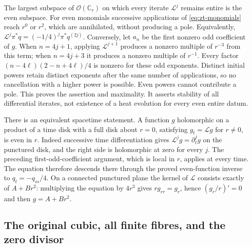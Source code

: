 The largest subspace of $\mathcal O(\mathbb C_r)$ on which every
iterate $\mathcal L^j$ remains entire is the even subspace.  For even
monomials successive applications of \eqref{eq:zt-monomials} reach
$r^0$ or $r^2$, which are annihilated, without producing a pole.
Equivalently, $\mathcal L^j\pi^*q=(-1/4)^j\pi^*q^{(2j)}$.
Conversely, let $a_n$ be the first nonzero odd coefficient of $g$.
When $n=4j+1$, applying $\mathcal L^{j+1}$ produces a nonzero multiple
of $r^{-3}$ from this term; when $n=4j+3$ it produces a nonzero
multiple of $r^{-1}$.  Every factor
$(n-4\ell)(2-n+4\ell)/4$ is nonzero for these odd exponents.
Distinct initial powers retain distinct exponents after the same
number of applications, so no cancellation with a higher power is
possible.  Even powers cannot contribute a pole.  This proves the
assertion and maximality.  It asserts stability of all differential
iterates, not existence of a heat evolution for every even entire datum.

There is an equivalent spacetime statement.  A function $g$ holomorphic
on a product of a time disk with a full disk about $r=0$, satisfying
$g_t=\mathcal Lg$ for $r\ne0$, is even in $r$.  Indeed successive
time differentiation gives $\mathcal L^jg=\partial_t^jg$ on the
punctured disk, and the right side is holomorphic at zero for every $j$.
The preceding first-odd-coefficient argument, which is local in $r$,
applies at every time.  The equation therefore descends there through
the proved even-function inverse to $q_t=-q_{ss}/4$.
On a connected punctured plane the kernel of $\mathcal L$ consists
exactly of $A+Br^2$: multiplying the equation by $4r^3$ gives
$rg_{rr}=g_r$, hence $(g_r/r)'=0$ and then $g=A+Br^2$.

\subsection{The original cubic, all finite fibres, and the zero divisor}

